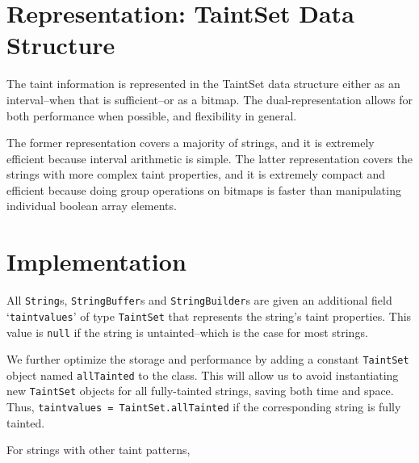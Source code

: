 \documentclass[times,11pt]{article}
\begin{document}
\section{Representation: TaintSet Data Structure}
The taint information is represented in the TaintSet data structure either as an interval--when that is sufficient--or as a bitmap. The dual-representation allows for both performance when possible, and flexibility in general.

The former representation covers a majority of strings, and it is extremely efficient because interval arithmetic is simple. The latter representation covers the strings with more complex taint properties, and it is extremely compact and efficient because doing group operations on bitmaps is faster than manipulating individual boolean array elements.
\section{Implementation}
All \texttt{String}s, \texttt{StringBuffer}s and \texttt{StringBuilder}s are given an additional field `\texttt{taintvalues}' of type \texttt{TaintSet} that represents the string's taint properties. This value is \texttt{null} if the string is untainted--which is the case for most strings.

We further optimize the storage and performance by adding a constant \texttt{TaintSet} object named \texttt{allTainted} to the class. This will allow us to avoid instantiating new \texttt{TaintSet} objects for all fully-tainted strings, saving both time and space. Thus, \texttt{taintvalues = TaintSet.allTainted} if the corresponding string is fully tainted.

For strings with other taint patterns, 
\end{document}
